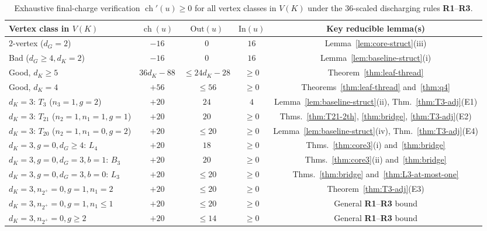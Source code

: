 \documentclass[11pt,a4paper]{article}
\theoremstyle{definition}
\newcommand{\ch}{\operatorname{ch}}
\begin{document}
\begin{table}[t]
\centering
\caption{Exhaustive final-charge verification $\ch'(u) \ge 0$ for all vertex classes in $V(K)$ under the $36$-scaled discharging rules \textbf{R1}--\textbf{R3}.}
\label{tab:discharging}
\footnotesize
\begin{tabular}{@{}lcccc@{}}
\toprule
Vertex class in $V(K)$ & $\ch(u)$ & $\mathrm{Out}(u)$ & $\mathrm{In}(u)$ & Key reducible lemma(s) \\
\midrule
$2$-vertex ($d_G = 2$) & $-16$ & $0$ & $16$ & Lemma~\ref{lem:core-struct}(iii) \\
Bad ($d_G \ge 4, d_K = 2$) & $-16$ & $0$ & $16$ & Lemma~\ref{lem:baseline-struct}(i) \\
Good, $d_K \ge 5$ & $36 d_K - 88$ & $\le 24 d_K - 28$ & $\ge 0$ & Theorem~\ref{thm:leaf-thread} \\
Good, $d_K = 4$ & $+56$ & $\le 56$ & $\ge 0$ & Theorems~\ref{thm:leaf-thread} and~\ref{thm:q4} \\
\midrule
$d_K = 3$: $T_3$ ($n_3=1, g=2$) & $+20$ & $24$ & $4$ & Lemma~\ref{lem:baseline-struct}(ii), Thm.~\ref{thm:T3-adj}(E1) \\
$d_K = 3$: $T_{21}$ ($n_2=1, n_1=1, g=1$) & $+20$ & $20$ & $\ge 0$ & Thms.~\ref{thm:T21-2th}, \ref{thm:bridge}, \ref{thm:T3-adj}(E2) \\
$d_K = 3$: $T_{20}$ ($n_2=1, n_1=0, g=2$) & $+20$ & $\le 20$ & $\ge 0$ & Lemma~\ref{lem:baseline-struct}(iv), Thm.~\ref{thm:T3-adj}(E4) \\
$d_K = 3, g=0, d_G \ge 4$: $L_4$ & $+20$ & $18$ & $\ge 0$ & Thms.~\ref{thm:core3}(i) and~\ref{thm:bridge} \\
$d_K = 3, g=0, d_G = 3, b=1$: $B_3$ & $+20$ & $20$ & $\ge 0$ & Thms.~\ref{thm:core3}(ii) and~\ref{thm:bridge} \\
$d_K = 3, g=0, d_G = 3, b=0$: $L_3$ & $+20$ & $\le 20$ & $\ge 0$ & Thms.~\ref{thm:bridge} and~\ref{thm:L3-at-most-one} \\
$d_K = 3, n_{2^+}=0, g=1, n_1=2$ & $+20$ & $\le 20$ & $\ge 0$ & Theorem~\ref{thm:T3-adj}(E3) \\
$d_K = 3, n_{2^+}=0, g=1, n_1 \le 1$ & $+20$ & $\le 20$ & $\ge 0$ & General \textbf{R1}--\textbf{R3} bound \\
$d_K = 3, n_{2^+}=0, g \ge 2$ & $+20$ & $\le 14$ & $\ge 0$ & General \textbf{R1}--\textbf{R3} bound \\
\bottomrule
\end{tabular}
\end{table}
\end{document}
